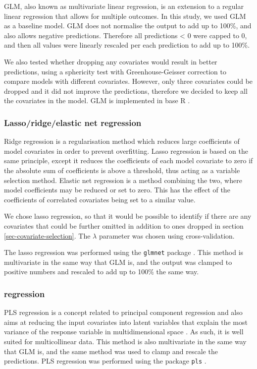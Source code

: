 \documentclass[a4paper,10pt]{article}
\begin{document}
\Gls{GLM}, also known as multivariate linear regression, is an extension to a regular linear regression that allows for multiple outcomes.
In this study, we used \gls{GLM} as a baseline model.
\Gls{GLM} does not normalise the output to add up to 100\%, and also allows negative predictions.
Therefore all predictions < 0 were capped to 0, and then all values were linearly rescaled per each prediction to add up to 100\%.

We also tested whether dropping any covariates would result in better predictions, using a sphericity test with Greenhouse-Geisser correction to compare models with different covariates.
However, only three covariates could be dropped and it did not improve the predictions, therefore we decided to keep all the covariates in the model.
\Gls{GLM} is implemented in base R \citep{r_2019}.

\subsubsection{Lasso/ridge/elastic net regression}

Ridge regression is a regularisation method which reduces large coefficients of model covariates in order to prevent overfitting.
Lasso regression is based on the same principle, except it reduces the coefficients of each model covariate to zero if the absolute sum of coefficients is above a threshold, thus acting as a variable selection method.
Elastic net regression is a method combining the two, where model coefficients may be reduced or set to zero.
This has the effect of the coefficients of correlated covariates being set to a similar value.

We chose lasso regression, so that it would be possible to identify if there are any covariates that could be further omitted in addition to ones dropped in section \ref{sec-covariate-selection}.
The $\lambda$ parameter was chosen using cross-validation.

The lasso regression was performed using the \texttt{glmnet} package \citep{glmnet}.
This method is multivariate in the same way that \gls{GLM} is, and the output was clamped to positive numbers and rescaled to add up to 100\% the same way.

\subsubsection{ regression}

\ac{PLS} regression is a concept related to principal component regression and also aims at reducing the input covariates into latent variables that explain the most variance of the response variable in multidimensional space \citep{martens_multivariate_1992}.
As such, it is well suited for multicollinear data.
This method is also multivariate in the same way that \gls{GLM} is, and the same method was used to clamp and rescale the predictions.
\ac{PLS} regression was performed using the package \texttt{pls} \citep{pls}.
\end{document}
